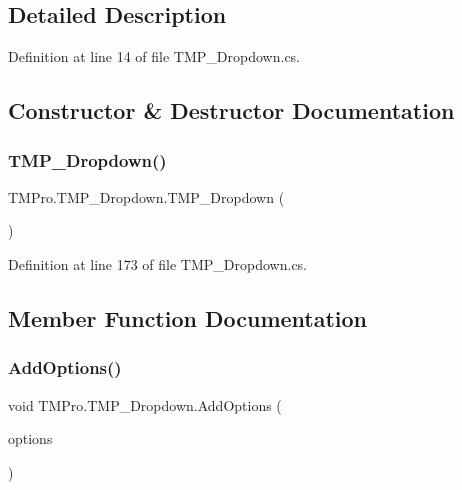 \subsection{Detailed Description}


Definition at line 14 of file T\+M\+P\+\_\+\+Dropdown.\+cs.



\subsection{Constructor \& Destructor Documentation}
\mbox{\label{class_t_m_pro_1_1_t_m_p___dropdown_a3cc2f5c541cb61a358c92d292128551d}} 
\subsubsection{\texorpdfstring{TMP\_Dropdown()}{TMP\_Dropdown()}}
{\footnotesize\ttfamily T\+M\+Pro.\+T\+M\+P\+\_\+\+Dropdown.\+T\+M\+P\+\_\+\+Dropdown (\begin{DoxyParamCaption}{ }\end{DoxyParamCaption})\hspace{0.3cm}{\ttfamily [protected]}}



Definition at line 173 of file T\+M\+P\+\_\+\+Dropdown.\+cs.



\subsection{Member Function Documentation}
\mbox{\label{class_t_m_pro_1_1_t_m_p___dropdown_aca7bde337dd9fb565f2a8ed96bf4bb25}} 
\subsubsection{\texorpdfstring{AddOptions()}{AddOptions()}\hspace{0.1cm}{\footnotesize\ttfamily [1/3]}}
{\footnotesize\ttfamily void T\+M\+Pro.\+T\+M\+P\+\_\+\+Dropdown.\+Add\+Options (\begin{DoxyParamCaption}\item[{List$<$ \mbox{\hyperlink{class_t_m_pro_1_1_t_m_p___dropdown_1_1_option_data}{Option\+Data}} $>$}]{options }\end{DoxyParamCaption})}



